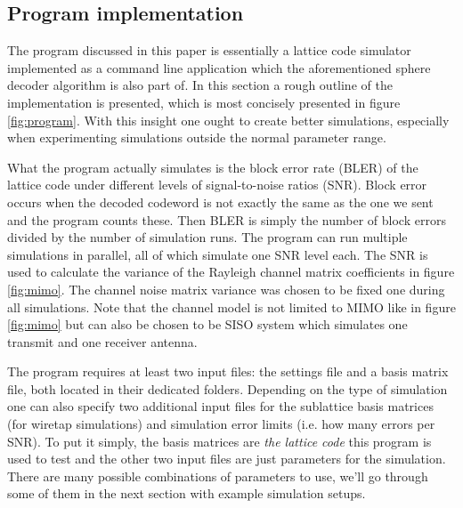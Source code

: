 \documentclass[english,12pt,a4paper,pdftex,sci,utf8]{aaltothesis}
\begin{document}
\subsection{Program implementation}
The program discussed in this paper is essentially a lattice code simulator implemented as a command line application which the aforementioned sphere decoder algorithm is also part of. In this section a rough outline of the implementation is presented, which is most concisely presented in figure \ref{fig:program}. With this insight one ought to create better simulations, especially when experimenting simulations outside the normal parameter range.
\par What the program actually simulates is the block error rate (BLER) of the lattice code under different levels of signal-to-noise ratios (SNR). Block error occurs when the decoded codeword is not exactly the same as the one we sent and the program counts these. Then BLER is simply the number of block errors divided by the number of simulation runs. The program can run multiple simulations in parallel, all of which simulate one SNR level each. The SNR is used to calculate the variance of the Rayleigh channel matrix coefficients in figure \ref{fig:mimo}. The channel noise matrix variance was chosen to be fixed one during all simulations. Note that the channel model is not limited to MIMO like in figure \ref{fig:mimo} but can also be chosen to be SISO system which simulates one transmit and one receiver antenna.
\par The program requires at least two input files: the settings file and a basis matrix file, both located in their dedicated folders. Depending on the type of simulation one can also specify two additional input files for the sublattice basis matrices (for wiretap simulations) and simulation error limits (i.e. how many errors per SNR). To put it simply, the basis matrices are \textit{the lattice code} this program is used to test and the other two input files are just parameters for the simulation. There are many possible combinations of parameters to use, we'll go through some of them in the next section with example simulation setups.
\end{document}
